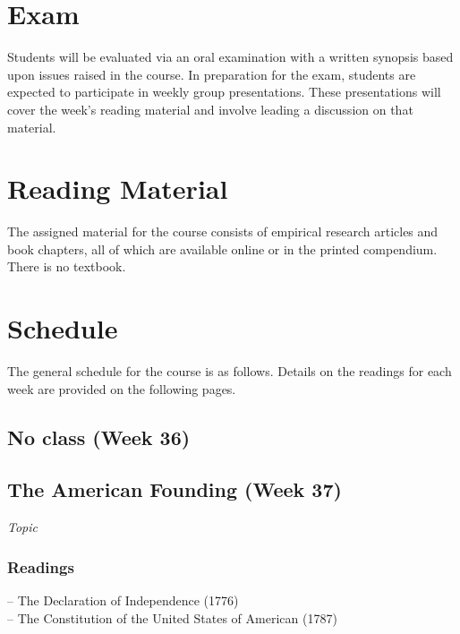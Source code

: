 \documentclass[12pt,a4paper]{article}
\begin{document}
\section{Exam}
Students will be evaluated via an oral examination with a written synopsis based upon issues raised in the course. In preparation for the exam, students are expected to participate in weekly group presentations. These presentations will cover the week's reading material and involve leading a discussion on that material.

\section{Reading Material}
The assigned material for the course consists of empirical research articles and book chapters, all of which are available online or in the printed compendium. There is no textbook.

\section{Schedule}
The general schedule for the course is as follows. Details on the readings for each week are provided on the following pages.

\secttoc


\clearpage


\subsection{No class (Week 36)}
\vspace{1em}


\clearpage
\subsection{The American Founding (Week 37)}
\emph{Topic}

\vspace{1em}
\subsubsection*{Readings}
-- The Declaration of Independence (1776)\\
-- The Constitution of the United States of American (1787)\\
\end{document}
